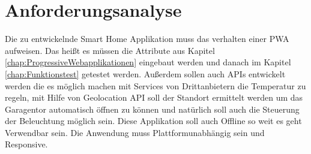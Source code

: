 \section{Anforderungsanalyse}\label{sub:Anforderungsanalyse}
Die zu entwickelnde Smart Home Applikation muss das verhalten einer \acs{PWA} aufweisen. Das heißt es müssen die Attribute aus Kapitel \ref{chap:ProgressiveWebapplikationen} eingebaut werden und danach im Kapitel \ref{chap:Funktionstest} getestet werden. Außerdem sollen auch APIs entwickelt \\werden die es möglich machen mit Services von Drittanbietern die Temperatur zu regeln, mit Hilfe von Geolocation API soll der Standort ermittelt werden um das Garagentor automatisch öffnen zu können und natürlich soll auch die Steuerung der Beleuchtung möglich sein. Diese Applikation soll auch Offline so weit es geht Verwendbar sein. Die Anwendung muss Plattformunabhängig sein und Responsive.


